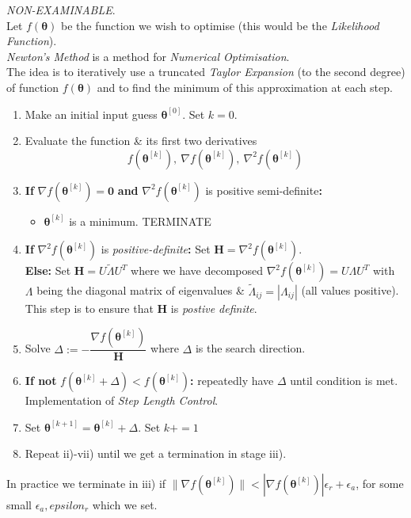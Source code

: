 \documentclass[11pt,a4paper]{article}
\begin{document}
\textit{NON-EXAMINABLE}.\\
Let $f(\pmb\theta)$ be the function we wish to optimise (this would be the \textit{Likelihood Function}).\\
\textit{Newton's Method} is a method for \textit{Numerical Optimisation}.\\
The idea is to iteratively use a truncated \textit{Taylor Expansion} (to the second degree) of function $f(\pmb\theta)$ and to find the minimum of this approximation at each step.
\begin{enumerate}
	\item Make an initial input guess $\pmb\theta^{[0]}$. Set $k=0$.
	\item Evaluate the function \& its first two derivatives
	$$f(\pmb\theta^{[k]}),\ \nabla f(\pmb\theta^{[k]}),\ \nabla^2f(\pmb\theta^{[k]})$$
	\item \textbf{If} $\nabla f(\pmb\theta^{[k]})=\pmb0$ \textbf{and} $\nabla^2f(\pmb\theta^{[k]})$ is positive semi-definite\textbf{:}
	\begin{itemize}
		\item $\pmb\theta^{[k]}$ is a minimum. TERMINATE
	\end{itemize}
	\item \textbf{If} $\nabla^2f(\pmb\theta^{[k]})$ is \textit{positive-definite}\textbf{:} Set $\textbf{H}=\nabla^2f(\pmb\theta^{[k]})$.\\
	\textbf{Else:} Set $\textbf{H}=U\tilde{\Lambda}U^T$ where we have decomposed $\nabla^2f(\pmb\theta^{[k]})=U\Lambda U^T$ with $\Lambda$ being the diagonal matrix of eigenvalues \& $\tilde{\Lambda}_{ij}=|\Lambda_{ij}|$ (all values positive).\\
	\nb This step is to ensure that $\textbf{H}$ is \textit{postive definite}.
	\item Solve $\Delta:=-\dfrac{\nabla f(\pmb\theta^{[k]})}{\textbf{H}}$ where $\Delta$ is the search direction.
	\item \textbf{If not} $f(\pmb\theta^{[k]}+\Delta)<f(\pmb\theta^{[k]})$\textbf{:} repeatedly have $\Delta$ until condition is met.\\
	\nb Implementation of \textit{Step Length Control}.
	\item Set $\pmb\theta^{[k+1]}=\pmb\theta^{[k]}+\Delta$. Set $k+=1$
	\item Repeat ii)-vii) until we get a termination in stage iii).
\end{enumerate}
\nb In practice we terminate in iii) if $\|\nabla f(\pmb\theta^{[k]})\|<|\nabla f(\pmb\theta^{[k]})|\epsilon_r+\epsilon_a$, for some small $\epsilon_a,epsilon_r$ which we set.\\
\end{document}
